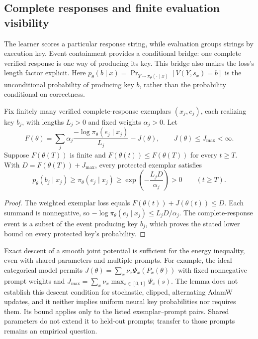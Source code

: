 \subsection{Complete responses and finite evaluation visibility}
\label{app:theory-exemplar-bridge}

The learner scores a particular response string, while evaluation groups
strings by execution key. Event containment provides a conditional bridge:
one complete verified response is one way of producing its key. This bridge
also makes the loss's length factor explicit. Here
$p_\theta(b\mid x)=\Pr_{Y\sim\pi_\theta(\cdot\mid x)}[V(Y,s_x)=b]$
is the unconditional probability of producing key $b$, rather than the
probability conditional on correctness.

\begin{lemma}
\enforcehalffinalproseline
\label{lem:shared-exemplar-retention}
Fix finitely many verified complete-response exemplars $(x_j,e_j)$, each
realizing key $b_j$, with lengths $L_j>0$ and fixed weights $\alpha_j>0$.
Let
\[
 F(\theta)=\sum_j\alpha_j
 \frac{-\log\pi_\theta(e_j\mid x_j)}{L_j}-J(\theta),
 \qquad J(\theta)\le J_{\max}<\infty.
\]
Suppose $F(\theta(T))$ is finite and
$F(\theta(t))\le F(\theta(T))$ for every $t\ge T$. With
$D=F(\theta(T))+J_{\max}$, every protected exemplar satisfies
\[
 p_\theta(b_j\mid x_j)\ge\pi_\theta(e_j\mid x_j)
 \ge\exp\!\left(-\frac{L_jD}{\alpha_j}\right)>0
 \qquad(t\ge T).
\]
\end{lemma}
\begin{proof}
\enforcehalffinalproseline
The weighted exemplar loss equals $F(\theta(t))+J(\theta(t))\le D$.
Each summand is nonnegative, so
$-\log\pi_\theta(e_j\mid x_j)\le L_jD/\alpha_j$.
The complete-response event is a subset of the event producing key $b_j$,
which proves the stated lower bound on every protected key's probability.
\end{proof}

Exact descent of a smooth joint potential is sufficient for the energy
inequality, even with shared parameters and multiple prompts. For example,
the ideal categorical model permits
$J(\theta)=\sum_x\nu_x\Psi_x(P_x(\theta))$ with fixed nonnegative prompt
weights and $J_{\max}=\sum_x\nu_x\max_{s\in[0,1]}\Psi_x(s)$. The lemma does not establish
this descent condition for stochastic, clipped, alternating AdamW updates,
and it neither implies uniform neural key probabilities nor requires them.
Its bound applies only to the listed exemplar--prompt pairs. Shared
parameters do not extend it to held-out prompts; transfer to those prompts
remains an empirical question.

